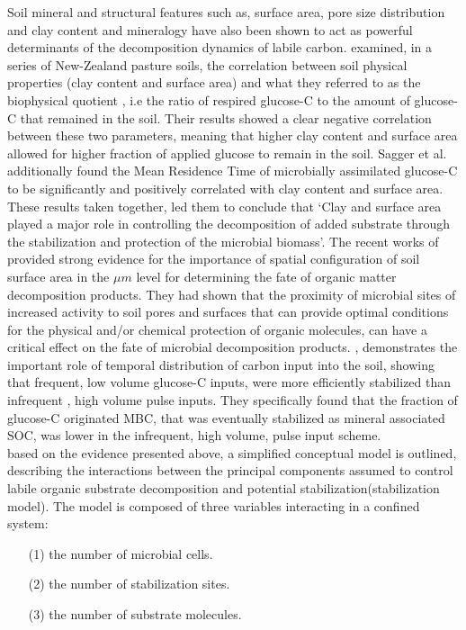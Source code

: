 	Soil mineral and structural features such as, surface area, pore size distribution and clay content and mineralogy have also been shown to act as powerful determinants of the decomposition dynamics of labile carbon. \citet{saggar1999} examined, in a series of New-Zealand pasture soils, the correlation between soil physical properties (clay content and surface area) and what they referred to as the biophysical quotient , i.e the ratio of respired glucose-C to the amount of glucose-C that remained in the soil. Their results showed a clear negative correlation between these two parameters, meaning that higher clay content and surface area allowed for higher fraction of applied glucose to remain in the soil. Sagger et al. additionally found the Mean Residence Time of microbially assimilated glucose-C to be significantly and positively correlated with clay content and surface area. These results taken together, led them to conclude that ‘Clay and surface area played a major role in controlling the decomposition of added substrate through the stabilization and protection of the microbial biomass’\citep[p. 12]{saggar1999}. The recent works of \citet{kravchenko2019, kravchenko2015} provided strong evidence for the importance of spatial configuration of soil surface area in the $ \mu m $ level for determining the fate of organic matter decomposition products. They had shown that the proximity of microbial sites of increased activity to soil pores and surfaces that can provide optimal conditions for the physical and/or chemical protection of organic molecules, can have a critical effect on the fate of microbial decomposition products.
	\citet{sokol2019c}, demonstrates the important role of temporal distribution of carbon input into the soil, showing that frequent, low volume glucose-C inputs, were more efficiently stabilized than infrequent , high volume pulse inputs. They specifically found that the fraction of glucose-C originated MBC, that was eventually stabilized as mineral associated SOC, was lower in the infrequent, high volume, pulse input scheme.\\
	based on the evidence presented above,  a simplified conceptual model is outlined, describing the interactions between the principal components assumed to control labile organic substrate decomposition and potential stabilization(stabilization model). The model is composed of three variables interacting in a confined system:
	\begin{enumerate}
		\item [(1)] the number of microbial cells.
		\item [(2)] the number of stabilization sites.
		\item [(3)]the number of substrate molecules.
	\end{enumerate}

